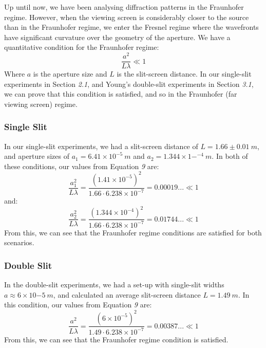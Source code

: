 \documentclass[a4paper]{article}
\begin{document}
Up until now, we have been analysing diffraction patterns in the Fraunhofer regime. However, when the viewing screen is considerably closer to the source than in the Fraunhofer regime, we enter the Fresnel regime where the wavefronts have significant curvature over the geometry of the aperture. We have a quantitative condition for the Fraunhofer regime:
\begin{equation}
\frac{a^2}{L\lambda}\ll 1
\end{equation} 
Where $a$ is the aperture size and $L$ is the slit-screen distance. In our single-slit experiments in Section \emph{2.1}, and Young's double-slit experiments in Section \emph{3.1}, we can prove that this condition is satisfied, and so in the Fraunhofer (far viewing screen) regime.
\subsubsection{Single Slit}
In our single-slit experiments, we had a slit-screen distance of $L=1.66\pm 0.01\ m$, and aperture sizes of $a_1=6.41\times 10^{-5}\ m$ and $a_2=1.344\times1-^{-4}\ m$. In both of these conditions, our values from Equation \emph 9 are:
\begin{equation}
\frac{a_1^2}{L\lambda}=\frac{(1.41\times10^{-5})^2}{1.66\cdot6.238\times10^{-7}}=0.00019...\ll 1
\end{equation}%
and:
\begin{equation}
\frac{a_2^2}{L\lambda}=\frac{(1.344\times10^{-4})^2}{1.66\cdot6.238\times10^{-7}}=0.01744...\ll 1
\end{equation}
From this, we can see that the Fraunhofer regime conditions are satisfied for both scenarios.
\subsubsection{Double Slit}
In the double-slit experiments, we had a set-up with single-slit widths $a\approx6\times10{-5}\ m$, and calculated an average slit-screen distance $L=1.49\ m$. In this condition, our values from Equation \emph 9 are:
\begin{equation}
\frac{a^2}{L\lambda}=\frac{(6\times10^{-5})^2}{1.49\cdot6.238\times10^{-7}}=0.00387...\ll 1
\end{equation}
From this, we can see that the Fraunhofer regime condition is satisfied.
\end{document}
